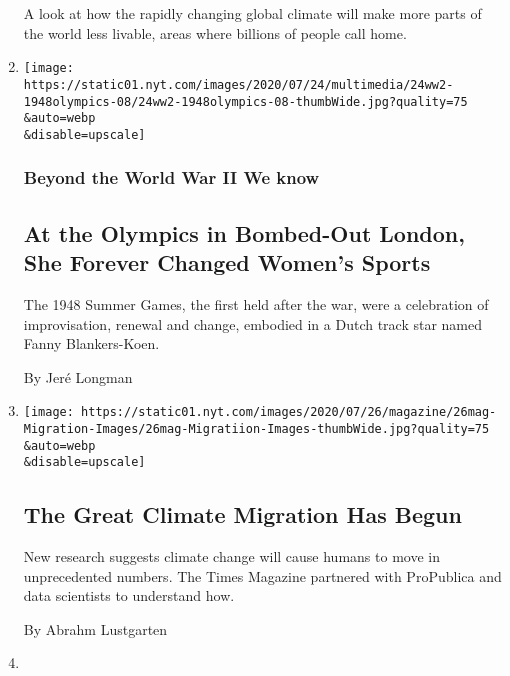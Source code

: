\begin{enumerate}
  A look at how the rapidly changing global climate will make more parts
  of the world less livable, areas where billions of people call home.
\item
  \href{/2020/07/24/magazine/1948-olympics-fanny-blankers-koen.html}{}

  \texttt{[image: https://static01.nyt.com/images/2020/07/24/multimedia/24ww2-1948olympics-08/24ww2-1948olympics-08-thumbWide.jpg?quality=75\\\&auto=webp\\\&disable=upscale]}

  \hypertarget{beyond-the-world-war-ii-we-know-1}{%
  \subsubsection{Beyond the World War II We
  know}\label{beyond-the-world-war-ii-we-know-1}}

  \hypertarget{at-the-olympics-in-bombed-out-london-she-forever-changed-womens-sports}{%
  \subsection{At the Olympics in Bombed-Out London, She Forever Changed
  Women's
  Sports}\label{at-the-olympics-in-bombed-out-london-she-forever-changed-womens-sports}}

  The 1948 Summer Games, the first held after the war, were a
  celebration of improvisation, renewal and change, embodied in a Dutch
  track star named Fanny Blankers-Koen.

  By Jeré Longman
\item
  \href{/interactive/2020/07/23/magazine/climate-migration.html}{}

  \texttt{[image: https://static01.nyt.com/images/2020/07/26/magazine/26mag-Migration-Images/26mag-Migratiion-Images-thumbWide.jpg?quality=75\\\&auto=webp\\\&disable=upscale]}

  \hypertarget{the-great-climate-migration-has-begun}{%
  \subsection{The Great Climate Migration Has
  Begun}\label{the-great-climate-migration-has-begun}}

  New research suggests climate change will cause humans to move in
  unprecedented numbers. The Times Magazine partnered with ProPublica
  and data scientists to understand how.

  By Abrahm Lustgarten
\item
  \href{/interactive/2020/07/22/magazine/worst-storms-argentina.html}{}


\end{enumerate}
